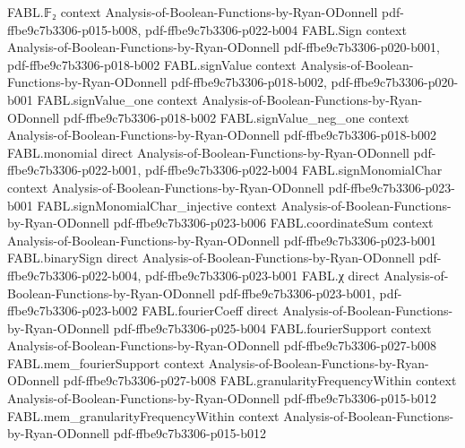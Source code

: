 \begin{theorem}
\label{FABL.vector_plancherel}
\leanok
{}
\proofstep
  {FABL.𝔽₂}
  {context}
  {Analysis-of-Boolean-Functions-by-Ryan-ODonnell}
  {pdf-ffbe9c7b3306-p015-b008,
    pdf-ffbe9c7b3306-p022-b004}
\proofstep
  {FABL.Sign}
  {context}
  {Analysis-of-Boolean-Functions-by-Ryan-ODonnell}
  {pdf-ffbe9c7b3306-p020-b001,
    pdf-ffbe9c7b3306-p018-b002}
\proofstep
  {FABL.signValue}
  {context}
  {Analysis-of-Boolean-Functions-by-Ryan-ODonnell}
  {pdf-ffbe9c7b3306-p018-b002,
    pdf-ffbe9c7b3306-p020-b001}
\proofstep
  {FABL.signValue_one}
  {context}
  {Analysis-of-Boolean-Functions-by-Ryan-ODonnell}
  {pdf-ffbe9c7b3306-p018-b002}
\proofstep
  {FABL.signValue_neg_one}
  {context}
  {Analysis-of-Boolean-Functions-by-Ryan-ODonnell}
  {pdf-ffbe9c7b3306-p018-b002}
\proofstep
  {FABL.monomial}
  {direct}
  {Analysis-of-Boolean-Functions-by-Ryan-ODonnell}
  {pdf-ffbe9c7b3306-p022-b001,
    pdf-ffbe9c7b3306-p022-b004}
\proofstep
  {FABL.signMonomialChar}
  {context}
  {Analysis-of-Boolean-Functions-by-Ryan-ODonnell}
  {pdf-ffbe9c7b3306-p023-b001}
\proofstep
  {FABL.signMonomialChar_injective}
  {context}
  {Analysis-of-Boolean-Functions-by-Ryan-ODonnell}
  {pdf-ffbe9c7b3306-p023-b006}
\proofstep
  {FABL.coordinateSum}
  {context}
  {Analysis-of-Boolean-Functions-by-Ryan-ODonnell}
  {pdf-ffbe9c7b3306-p023-b001}
\proofstep
  {FABL.binarySign}
  {direct}
  {Analysis-of-Boolean-Functions-by-Ryan-ODonnell}
  {pdf-ffbe9c7b3306-p022-b004,
    pdf-ffbe9c7b3306-p023-b001}
\proofstep
  {FABL.χ}
  {direct}
  {Analysis-of-Boolean-Functions-by-Ryan-ODonnell}
  {pdf-ffbe9c7b3306-p023-b001,
    pdf-ffbe9c7b3306-p023-b002}
\proofstep
  {FABL.fourierCoeff}
  {direct}
  {Analysis-of-Boolean-Functions-by-Ryan-ODonnell}
  {pdf-ffbe9c7b3306-p025-b004}
\proofstep
  {FABL.fourierSupport}
  {context}
  {Analysis-of-Boolean-Functions-by-Ryan-ODonnell}
  {pdf-ffbe9c7b3306-p027-b008}
\proofstep
  {FABL.mem_fourierSupport}
  {context}
  {Analysis-of-Boolean-Functions-by-Ryan-ODonnell}
  {pdf-ffbe9c7b3306-p027-b008}
\proofstep
  {FABL.granularityFrequencyWithin}
  {context}
  {Analysis-of-Boolean-Functions-by-Ryan-ODonnell}
  {pdf-ffbe9c7b3306-p015-b012}
\proofstep
  {FABL.mem_granularityFrequencyWithin}
  {context}
  {Analysis-of-Boolean-Functions-by-Ryan-ODonnell}
  {pdf-ffbe9c7b3306-p015-b012}

\end{theorem}
